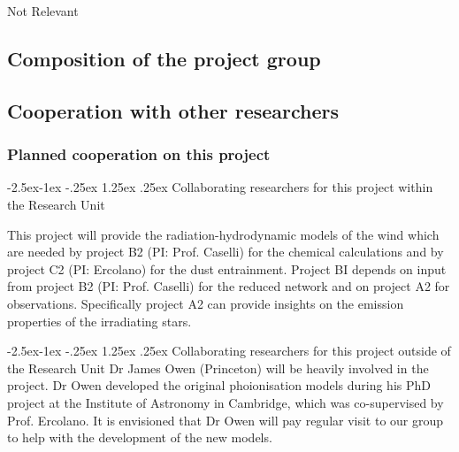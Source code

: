 \documentclass[10pt,fleqn,twoside]{article}
\makeatletter
\newcommand{\Tcol}{\color{blue}}
\renewcommand\paragraph{\@startsection{paragraph}{4}{\z@}%
            {-2.5ex\@plus -1ex \@minus -.25ex}%
            {1.25ex \@plus .25ex}%
            {\normalfont\normalsize\bfseries}}
\makeatother
\begin{document}
Not Relevant

\subsection{\Tcol Composition of the project group}



\subsection{\Tcol Cooperation with other researchers}

\subsubsection{\Tcol Planned cooperation on this project}

\paragraph{\Tcol Collaborating researchers for this project within the
  Research Unit}


This project will provide the radiation-hydrodynamic models of the
wind which are needed by project B2 (PI: Prof. Caselli) for the
chemical calculations and by project C2 (PI: Ercolano) for the dust
entrainment. Project BI depends on input from project B2 (PI:
Prof. Caselli)  for the reduced network and on
project A2 for observations. Specifically project A2 can
provide insights on the emission properties of the irradiating stars.

\paragraph{\Tcol Collaborating researchers for this project outside of
  the Research Unit}
Dr James Owen (Princeton) will be heavily involved in the
project. Dr Owen developed the original
phoionisation models during his PhD project at the Institute of
Astronomy in Cambridge, which was co-supervised by
Prof. Ercolano. It is envisioned that Dr Owen will pay regular visit
to our group to help with the development of the new models. 
\end{document}
